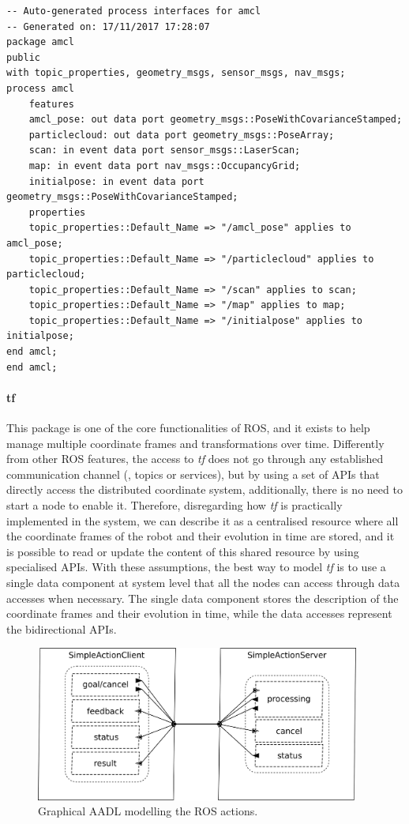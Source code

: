 \bigskip

\begin{lstlisting}[language=AADL,caption={Auto-generated AADL to model the amcl package and the amcl node},label=lst:legacy-nodes]
-- Auto-generated process interfaces for amcl
-- Generated on: 17/11/2017 17:28:07
package amcl
public
with topic_properties, geometry_msgs, sensor_msgs, nav_msgs;
process amcl
	features
	amcl_pose: out data port geometry_msgs::PoseWithCovarianceStamped;
	particlecloud: out data port geometry_msgs::PoseArray;
	scan: in event data port sensor_msgs::LaserScan;
	map: in event data port nav_msgs::OccupancyGrid;
	initialpose: in event data port geometry_msgs::PoseWithCovarianceStamped;
	properties
	topic_properties::Default_Name => "/amcl_pose" applies to amcl_pose;
	topic_properties::Default_Name => "/particlecloud" applies to particlecloud;
	topic_properties::Default_Name => "/scan" applies to scan;
	topic_properties::Default_Name => "/map" applies to map;
	topic_properties::Default_Name => "/initialpose" applies to initialpose;
end amcl;
end amcl;	
\end{lstlisting}

\paragraph{tf} This package is one of the core functionalities of ROS, and it exists to help manage multiple coordinate frames and transformations over time. Differently from other ROS features, the access to \textit{tf} does not go through any established communication channel (\ie, topics or services), but by using a set of APIs that directly access the distributed coordinate system, additionally, there is no need to start a node to enable it. Therefore, disregarding how \textit{tf} is practically implemented in the system, we can describe it as a centralised resource where all the coordinate frames of the robot and their evolution in time are stored, and it is possible to read or update the content of this shared resource by using specialised APIs. With these assumptions, the best way to model \textit{tf} is to use a single data component at system level that all the nodes can access through data accesses when necessary. The single data component stores the description of the coordinate frames and their evolution in time, while the data accesses represent the bidirectional APIs.

\begin{figure}[t]
    \centering
    \includegraphics[width=0.95\textwidth]{gfx/action}
    \caption{Graphical AADL modelling the ROS actions.}\label{fig:action}
\end{figure}

